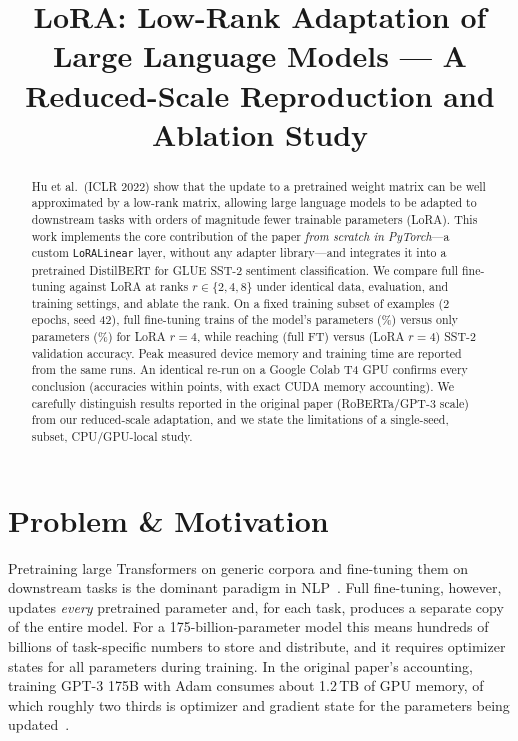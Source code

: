 \documentclass[conference]{IEEEtran}
\begin{document}
\title{LoRA: Low-Rank Adaptation of Large Language Models --- A Reduced-Scale
Reproduction and Ablation Study}

\author{
}

\maketitle

\begin{abstract}
Hu et al.\ (ICLR 2022) show that the update to a pretrained weight matrix can be
well approximated by a low-rank matrix, allowing large language models to be
adapted to downstream tasks with orders of magnitude fewer trainable parameters
(LoRA). This work implements the core contribution of the paper \emph{from
scratch in PyTorch}---a custom \texttt{LoRALinear} layer, without any adapter
library---and integrates it into a pretrained DistilBERT for GLUE SST-2
sentiment classification. We compare full fine-tuning against LoRA at ranks
$r\in\{2,4,8\}$ under identical data, evaluation, and training settings, and
ablate the rank. On a fixed training subset of \SubsetSize{}
examples (2 epochs, seed 42), full fine-tuning trains \TrainpFULL{} of the
model's \TpFULL{} parameters (\TrainpcFULL{}\%) versus only \TrainpRFOUR{}
parameters (\TrainpcRFOUR{}\%) for LoRA $r{=}4$, while reaching \ValFULL{}
(full FT) versus \ValRFOUR{} (LoRA $r{=}4$) SST-2 validation
accuracy. Peak measured device memory and training time are reported from the
same runs. An identical re-run on a Google Colab T4 GPU confirms every
conclusion (accuracies within \MaxDeltaT{} points, with exact CUDA memory
accounting). We carefully distinguish results reported in the original paper
(RoBERTa/GPT-3 scale) from our reduced-scale adaptation, and we state the
limitations of a single-seed, subset, CPU/GPU-local study.
\end{abstract}

\section{Problem & Motivation}
Pretraining large Transformers on generic corpora and fine-tuning them on
downstream tasks is the dominant paradigm in NLP~\cite{devlin2019bert}. Full
fine-tuning, however, updates \emph{every} pretrained parameter and, for each
task, produces a separate copy of the entire model. For a 175-billion-parameter
model this means hundreds of billions of task-specific numbers to store and
distribute, and it requires optimizer states for all parameters during
training. In the original paper's accounting, training GPT-3 175B with Adam
consumes about 1.2\,TB of GPU memory, of which roughly two thirds is optimizer
and gradient state for the parameters being updated~\cite{hu2022lora}.
\end{document}
